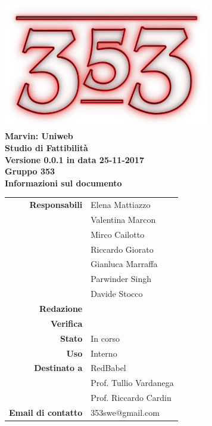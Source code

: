 \documentclass[openany, a4paper, 12pt]{report}
\begin{document}
\begin{titlepage}
	\centering
	\vfill
	{
		\bfseries
		\vskip2cm
		\includegraphics[width=9cm]{../../common/images/logo.png} \\
		\Large Marvin: Uniweb \\
		\vfill
		\Huge Studio di Fattibilità\\
		\Large Versione 0.0.1 in data 25-11-2017\\
		\vfill
		\large Gruppo 353\\
		\vfill
	\normalsize Informazioni sul documento\\
\begin{table}[htbp]
	\centering
	\renewcommand\arraystretch{1.2}
	\begin{tabular}{r|l}
		\hline
		\textbf{Responsabili}	& Elena Mattiazzo\\
								& Valentina Marcon\\
								& Mirco Cailotto\\
								& Riccardo Giorato\\
								& Gianluca Marraffa\\
								& Parwinder Singh\\
								& Davide Stocco\\
		
		\textbf{Redazione} 	& \\
		\textbf{Verifica} 	& \\	
						
		\textbf{Stato} 			& In corso\\
		\textbf{Uso}			& Interno\\
		\textbf{Destinato a}   	& RedBabel\\
								& Prof. Tullio Vardanega\\
								& Prof. Riccardo Cardin\\
		
		\textbf{Email di contatto}	& 353swe@gmail.com
	\end{tabular}
\end{table}
		\vfill
	}    
\end{titlepage}

\tableofcontents
\newpage
{}

%
%
%
%
%
%
%
%
 
\end{document}

